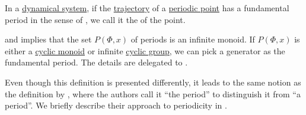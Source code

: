 \begin{definition}\label{def:dynamical_system_fundamental_period}\mimprovised
  In a \hyperref[def:dynamical_system]{dynamical system}, if the \hyperref[def:dynamical_system_trajectory]{trajectory} of a \hyperref[def:dynamical_system_periodicity]{periodic point} has a fundamental period in the sense of , we call it the  of the point.
\end{definition}
\begin{comments}
  \item {} and  implies that the set \( P(\Phi, x) \) of periods is an infinite monoid. If \( P(\Phi, x) \) is either a \hyperref[def:cyclic_monoid]{cyclic monoid} or infinite \hyperref[def:cyclic_group]{cyclic group}, we can pick a generator as the fundamental period. The details are delegated to .

  \item Even though this definition is presented differently, it leads to the same notion as the definition by , where the authors call it \enquote{the period} to distinguish it from \enquote{a period}. We briefly describe their approach to periodicity in .
\end{comments}

